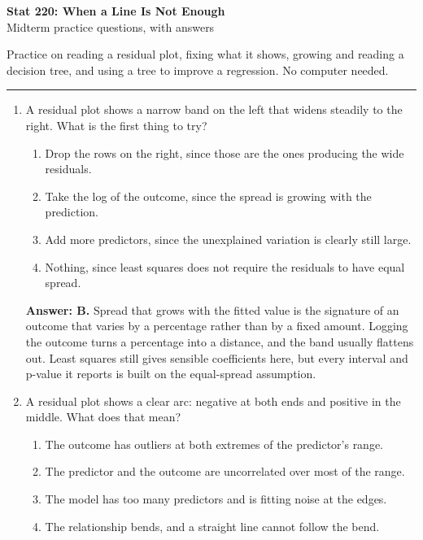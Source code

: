 \documentclass[11pt]{article}
\begin{document}
\begin{center}
{\Large\textbf{Stat 220: When a Line Is Not Enough}}\\[3pt]
{\large Midterm practice questions, with answers}\\[6pt]
\end{center}

Practice on reading a residual plot, fixing what it shows, growing and reading a decision
tree, and using a tree to improve a regression. No computer needed.

\vspace{8pt}
\hrule
\vspace{10pt}

\begin{enumerate}[itemsep=14pt]
\item A residual plot shows a narrow band on the left that widens steadily to the right. What is the first thing to try?

\begin{enumerate}[label=\Alph*., itemsep=1pt, topsep=3pt]
  \item Drop the rows on the right, since those are the ones producing the wide residuals.
  \item Take the log of the outcome, since the spread is growing with the prediction.
  \item Add more predictors, since the unexplained variation is clearly still large.
  \item Nothing, since least squares does not require the residuals to have equal spread.
\end{enumerate}

\vspace{2pt}
\textbf{Answer: B.} Spread that grows with the fitted value is the signature of an outcome that varies by a percentage rather than by a fixed amount. Logging the outcome turns a percentage into a distance, and the band usually flattens out. Least squares still gives sensible coefficients here, but every interval and p-value it reports is built on the equal-spread assumption.
\vspace{4pt}

\item A residual plot shows a clear arc: negative at both ends and positive in the middle. What does that mean?

\begin{enumerate}[label=\Alph*., itemsep=1pt, topsep=3pt]
  \item The outcome has outliers at both extremes of the predictor's range.
  \item The predictor and the outcome are uncorrelated over most of the range.
  \item The model has too many predictors and is fitting noise at the edges.
  \item The relationship bends, and a straight line cannot follow the bend.
\end{enumerate}


\end{enumerate}
\end{document}
